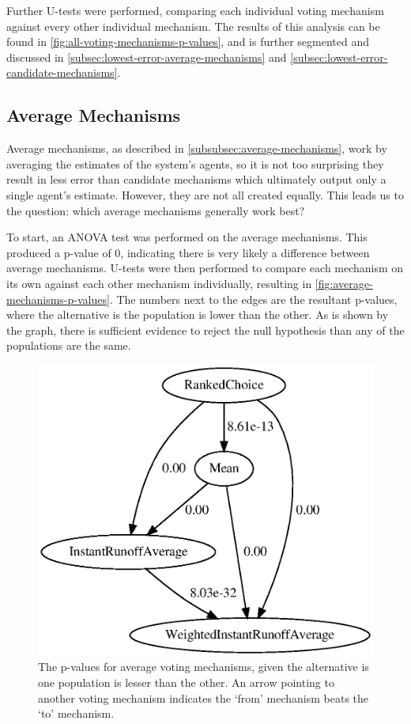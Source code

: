Further U-tests were performed, comparing each individual voting mechanism against
every other individual mechanism.
The results of this analysis can be found in
\autoref{fig:all-voting-mechanisms-p-values}, and is further segmented and discussed in
\autoref{subsec:lowest-error-average-mechanisms} and
\autoref{subsec:lowest-error-candidate-mechanisms}.

\subsection{Average Mechanisms}\label{subsec:lowest-error-average-mechanisms}
Average mechanisms, as described in \autoref{subsubsec:average-mechanisms}, work by
averaging the estimates of the system's agents, so it is not too surprising they
result in less error than candidate mechanisms which ultimately output only a single
agent's estimate.
However, they are not all created equally.
This leads us to the question: which average mechanisms generally work best?

To start, an ANOVA test was performed on the average mechanisms.
This produced a p-value of 0, indicating there is very likely a difference between
average mechanisms.
U-tests were then performed to compare each mechanism on its own against each other
mechanism individually, resulting in \autoref{fig:average-mechanisms-p-values}.
The numbers next to the edges are the resultant p-values, where the alternative is
the population is lower than the other.
As is shown by the graph, there is sufficient evidence to reject the null hypothesis
than any of the populations are the same.

\begin{figure}[htbp]
    \centering
    \includegraphics[scale=0.75]
    {./content/figures/voting_mechanisms/average-mechanisms-p-values.gv}
    \caption{The p-values for average voting mechanisms, given the alternative is one
    population is lesser than the other.
    An arrow pointing to another voting mechanism indicates the `from' mechanism
    beats the `to' mechanism.}
    \label{fig:average-mechanisms-p-values}
\end{figure}

